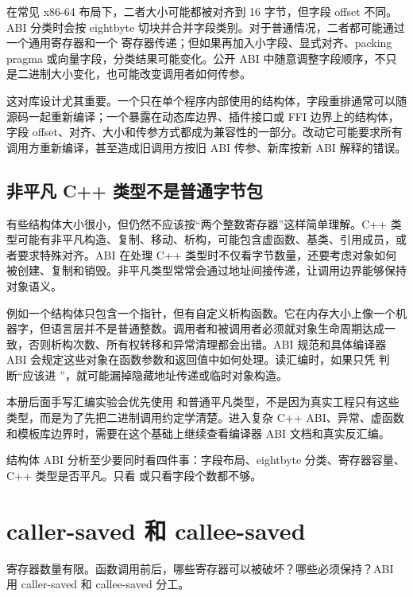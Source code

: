 在常见 x86-64 布局下，二者大小可能都被对齐到 16 字节，但字段 offset 不同。ABI 分类时会按 eightbyte 切块并合并字段类别。对于普通情况，二者都可能通过一个通用寄存器和一个  寄存器传递；但如果再加入小字段、显式对齐、packing pragma 或向量字段，分类结果可能变化。公开 ABI 中随意调整字段顺序，不只是二进制大小变化，也可能改变调用者如何传参。

这对库设计尤其重要。一个只在单个程序内部使用的结构体，字段重排通常可以随源码一起重新编译；一个暴露在动态库边界、插件接口或 FFI 边界上的结构体，字段 offset、对齐、大小和传参方式都成为兼容性的一部分。改动它可能要求所有调用方重新编译，甚至造成旧调用方按旧 ABI 传参、新库按新 ABI 解释的错误。

\subsection{非平凡 C++ 类型不是普通字节包}

有些结构体大小很小，但仍然不应该按“两个整数寄存器”这样简单理解。C++ 类型可能有非平凡构造、复制、移动、析构，可能包含虚函数、基类、引用成员，或者要求特殊对齐。ABI 在处理 C++ 类型时不仅看字节数量，还要考虑对象如何被创建、复制和销毁。非平凡类型常常会通过地址间接传递，让调用边界能够保持对象语义。

例如一个结构体只包含一个指针，但有自定义析构函数。它在内存大小上像一个机器字，但语言层并不是普通整数。调用者和被调用者必须就对象生命周期达成一致，否则析构次数、所有权转移和异常清理都会出错。ABI 规范和具体编译器 ABI 会规定这些对象在函数参数和返回值中如何处理。读汇编时，如果只凭  判断“应该进 ”，就可能漏掉隐藏地址传递或临时对象构造。

本册后面手写汇编实验会优先使用  和普通平凡类型，不是因为真实工程只有这些类型，而是为了先把二进制调用约定学清楚。进入复杂 C++ ABI、异常、虚函数和模板库边界时，需要在这个基础上继续查看编译器 ABI 文档和真实反汇编。

\begin{keyidea}
结构体 ABI 分析至少要同时看四件事：字段布局、eightbyte 分类、寄存器容量、C++ 类型是否平凡。只看  或只看字段个数都不够。
\end{keyidea}

\section{caller-saved 和 callee-saved}

寄存器数量有限。函数调用前后，哪些寄存器可以被破坏？哪些必须保持？ABI 用 caller-saved 和 callee-saved 分工。


